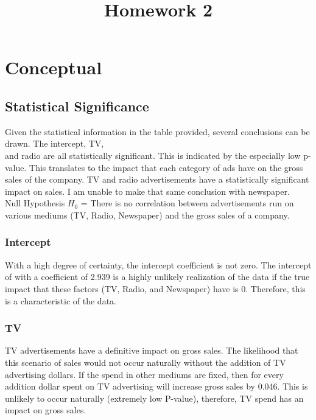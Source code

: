 \documentclass[11pt]{article}
\title{Homework 2}
\begin{document}
    
    
   	

    \section{Conceptual}\label{conceptual}

    \subsection{Statistical Significance}\label{statistical-significance}

Given the statistical information in the table provided, several
conclusions can be drawn. The intercept, TV,\\
and radio are all statistically significant. This is indicated by the
especially low p-value. This translates to the impact that each category
of ads have on the gross sales of the company. TV and radio
advertisements have a statistically significant impact on sales. I am
unable to make that same conclusion with newspaper. \\
Null Hypothesis $H_0$ = There is no correlation between advertisements run on
various mediums (TV, Radio, Newspaper) and the gross sales of a company. 

\subsubsection{Intercept}\label{intercept}

With a high degree of certainty, the intercept coefficient is not zero.
The intercept of with a coefficient of 2.939 is a highly unlikely
realization of the data if the true impact that these factors (TV,
Radio, and Newspaper) have is 0. Therefore, this is a characteristic of
the data.

\subsubsection{TV}\label{tv}

TV advertisements have a definitive impact on gross sales. The likelihood
that this scenario of sales would not occur naturally without the
addition of TV advertising dollars. If the spend in other mediums are
fixed, then for every addition dollar spent on TV advertising will
increase gross sales by 0.046. This is unlikely to occur naturally
(extremely low P-value), therefore, TV spend has an impact on gross sales.
\end{document}
